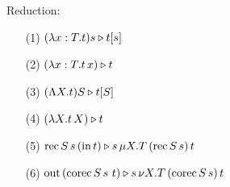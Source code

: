 Reduction:

\vspace*{0.3cm}
\begin{minipage}{0.25\textwidth}
  \begin{enumerate}
    \item[(1)] $(\lambda x : T.t) s \triangleright t[s]$
    \item[(2)] $(\lambda x : T.t \, x) \triangleright t$
  \end{enumerate}
\end{minipage}
\begin{minipage}{0.25\textwidth}
  \begin{enumerate}
    \item[(3)] $(\Lambda X.t) S \triangleright t[S]$
    \item[(4)] $(\lambda X.t \, X) \triangleright t$
  \end{enumerate}
\end{minipage}
\begin{minipage}{0.45\textwidth}
  \begin{enumerate}
    \item[(5)] $\text{rec} \, S \, s \, (\text{in} \, t) \triangleright s \, \mu X.T \, (\text{rec} \, S \, s) \, t$
    \item[(6)] $\text{out} \, (\text{corec} \, S \, s \, \, t) \triangleright s \, \nu X.T \, (\text{corec} \, S \, s) \, t$
  \end{enumerate}
\end{minipage}
